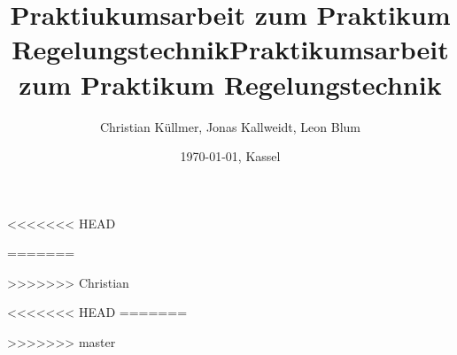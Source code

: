 \documentclass[10pt]{scrartcl}
\begin{document}
<<<<<<< HEAD
\title{Praktiukumsarbeit zum Praktikum Regelungstechnik}
=======











\title{Praktikumsarbeit zum Praktikum Regelungstechnik}
>>>>>>> Christian
\author{Christian Küllmer, Jonas Kallweidt, Leon Blum}
\date{\today{}, Kassel}
\maketitle
\newpage
\renewcommand{\contentsname}{Inhaltsverzeichnis}
\tableofcontents
\newpage
\listoffigures
<<<<<<< HEAD
=======
\newpage



>>>>>>> master
\end{document}

